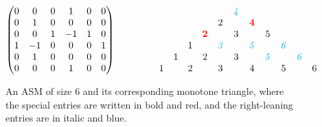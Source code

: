 \documentclass[11pt]{article}
\theoremstyle{definition}
\numberwithin{equation}{section}
\newcommand{\red}[1]{{\color{red}{#1}}}
\newcommand{\cyan}[1]{{\color{cyan}{#1}}}
\newcounter{x}
\newcounter{y}
\newcounter{z}
\begin{document}
\begin{figure}
\begin{center}
\[
\begin{pmatrix}
0 & 0 & 0 & 1 & 0 & 0 \\
0 & 1 & 0 & 0 & 0 & 0 \\
0 & 0 & 1 & -1 & 1 & 0 \\
1 & -1 & 0 & 0 & 0 & 1 \\
0 & 1 & 0 & 0 & 0 & 0 \\
0 & 0 & 0 & 1 & 0 & 0
\end{pmatrix}
\qquad \qquad
\begin{array}{c cc cc cc cc cc}
&&&&& \it{\cyan{4}} \\
&&&& 2 && \mathbf{\red{4}}\\
&&&\mathbf{\red{2}} && 3 && 5 \\
&& 1 && \it{\cyan{3}} && \it{\cyan{5}} && \it{\cyan{6}}\\
& 1 && 2 && 3 && \it{\cyan{5}} && \it{\cyan{6}}\\
1 && 2 && 3 && 4 && 5 && 6
\end{array}
\]
\end{center}
\caption{\label{fig: ASM and MT} An ASM of size $6$ and its corresponding monotone triangle, where the special entries are written in bold and red, and the right-leaning entries are in italic and blue.}
\end{figure}
\end{document}
